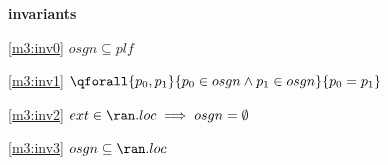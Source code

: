 \textbf{invariants}
\begin{block}
\item[ \eqref{m3:inv0} ]$osgn \subseteq plf $ %
\item[ \eqref{m3:inv1} ]$\qforall{p_0,p_1}{ p_0 \in osgn \land p_1 \in osgn }{ p_0 = p_1 } $ %
\item[ \eqref{m3:inv2} ]$ext \in \ran.loc \implies osgn = \emptyset $ %
\item[ \eqref{m3:inv3} ]$osgn \subseteq \ran.loc $ %
\end{block}
